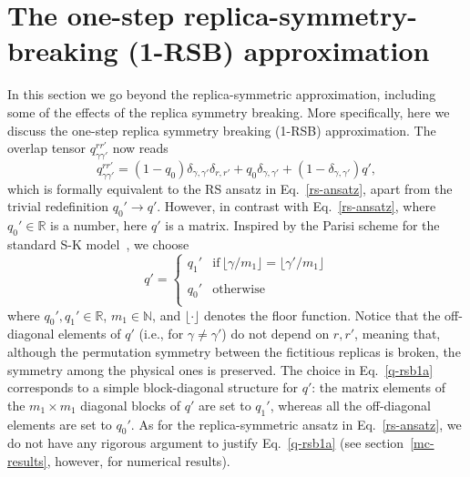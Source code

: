 \documentclass[twocolumn,superscriptaddress,prb,10pt]{revtex4-1}
\begin{document}
\section{The one-step replica-symmetry-breaking (1-RSB) approximation}
\label{rsb-1-section}

In this section we go beyond the replica-symmetric approximation, including some 
of the effects of the replica symmetry breaking. More specifically, here we discuss 
the one-step replica symmetry breaking (1-RSB) approximation. The overlap tensor 
$q_{\gamma\gamma'}^{rr'}$ now reads  
%
\begin{equation}
\label{q-rsb1}
q_{\gamma\gamma'}^{rr'}=(1-q_0)\delta_{\gamma,\gamma'}\delta_{r,r'} +
q_0\delta_{\gamma,\gamma'}+(1-\delta_{\gamma,\gamma'})q', 
\end{equation}
%
which is formally equivalent to the RS ansatz in Eq.~\eqref{rs-ansatz}, apart from 
the trivial redefinition $q_0'\to q'$. However, in contrast with Eq.~\eqref{rs-ansatz}, 
where $q_0'\in\mathbb{R}$ is a number, here $q'$ is a matrix. Inspired by the Parisi 
scheme for the standard S-K model~\cite{parisi-1979}, we choose 
%
\begin{equation}
q'=\left\{
\begin{array}{cc}
q_1' & \textrm{if}\, \lfloor\gamma/m_1\rfloor=\lfloor\gamma'/m_1\rfloor\\\\
q_0' & \textrm{otherwise}\\
\end{array}
\right.
\label{q-rsb1a}
\end{equation}
%
where $q_0',q_1'\in{\mathbb R}$, $m_1\in{\mathbb N}$, and $\lfloor\cdot\rfloor$ 
denotes the floor function. Notice that the off-diagonal elements of $q'$ (i.e., for 
$\gamma\ne\gamma'$) do not depend on $r,r'$, meaning that, although the permutation 
symmetry between the fictitious replicas is broken, the symmetry among the physical ones 
is preserved. The choice in Eq.~\eqref{q-rsb1a} corresponds to a simple block-diagonal 
structure for $q'$: the matrix elements of the $m_1\times m_1$ diagonal blocks of $q'$ 
are set to $q_1'$, whereas all the off-diagonal elements are set to $q_0'$. As for the 
replica-symmetric ansatz in Eq.~\eqref{rs-ansatz}, we do not have any rigorous argument 
to justify Eq.~\eqref{q-rsb1a} (see section~\eqref{mc-results}, however, for numerical 
results).
\end{document}
